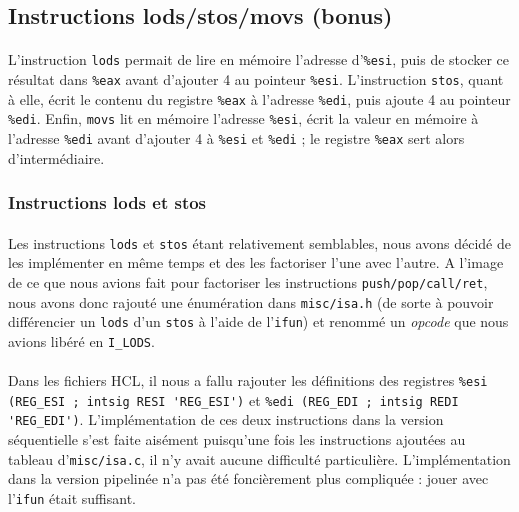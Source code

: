 \documentclass[12pt]{article}
\begin{document}
\subsection{Instructions lods/stos/movs (bonus)}
\paragraph{}L'instruction \verb+lods+ permait de lire en mémoire l'adresse d'\verb+%esi+, puis de stocker ce résultat dans \verb+%eax+ avant d'ajouter 4 au pointeur \verb+%esi+. L'instruction \verb+stos+, quant à elle, écrit le contenu du registre \verb+%eax+ à l'adresse \verb+%edi+, puis ajoute 4 au pointeur \verb+%edi+. Enfin, \verb+movs+ lit en mémoire l'adresse \verb+%esi+, écrit la valeur en mémoire à l'adresse \verb+%edi+ avant d'ajouter 4 à \verb+%esi+ et \verb+%edi+ ; le registre \verb+%eax+ sert alors d'intermédiaire.


\subsubsection{Instructions lods et stos}
\paragraph{}Les instructions \verb+lods+ et \verb+stos+ étant relativement semblables, nous avons décidé de les implémenter en même temps et des les factoriser l'une avec l'autre. A l'image de ce que nous avions fait pour factoriser les instructions \verb+push/pop/call/ret+, nous avons donc rajouté une énumération dans \verb+misc/isa.h+ (de sorte à pouvoir différencier un \verb+lods+ d'un \verb+stos+ à l'aide de l'\verb+ifun+) et renommé un {\itshape opcode} que nous avions libéré en \verb+I_LODS+.

\paragraph{}Dans les fichiers HCL, il nous a fallu rajouter les définitions des registres \verb+%esi (REG_ESI ; intsig RESI 'REG_ESI')+ et \verb+%edi (REG_EDI ; intsig REDI 'REG_EDI')+. L'implémentation de ces deux instructions dans la version séquentielle s'est faite aisément puisqu'une fois les instructions ajoutées au tableau d'\verb+misc/isa.c+, il n'y avait aucune difficulté particulière. L'implémentation dans la version pipelinée n'a pas été foncièrement plus compliquée : jouer avec l'\verb+ifun+ était suffisant.
\end{document}
